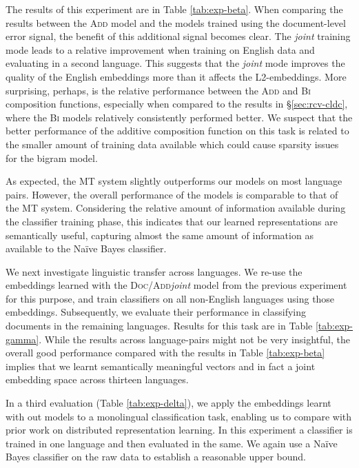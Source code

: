 \documentclass[11pt]{article}
\newcommand{\addMod}{\textsc{Add}\xspace}
\newcommand{\flatMod}{\textsc{Bi}\xspace}
\newcommand{\docModadd}{\textsc{Doc/Add}\xspace}
\newcommand{\joint}{\textit{joint}\xspace}
\begin{document}
The results of this experiment are in Table \ref{tab:exp-beta}.  When comparing
the results between the \addMod model and the models trained using the
document-level error signal, the benefit of this additional signal becomes
clear. The \joint training mode leads to a relative improvement when training
on English data and evaluating in a second language.  This suggests that the
\joint mode improves the quality of the English embeddings more than it affects
the L2-embeddings. More surprising, perhaps, is the relative performance
between the \addMod and \flatMod composition functions, especially when compared
to the results in \S\ref{sec:rcv-cldc}, where the \flatMod models relatively
consistently performed better. We suspect that the better performance of the
additive composition function on this task is related to the smaller amount of
training data available which could cause sparsity issues for the bigram model.

As expected, the MT system slightly outperforms our models on most language
pairs. However, the overall performance of the models is comparable to that of
the MT system. Considering the relative amount of information available during
the classifier training phase, this indicates that our learned representations
are semantically useful, capturing almost the same amount of information as
available to the Na\"{i}ve Bayes classifier.

We next investigate linguistic transfer across languages.  We re-use
the embeddings learned with the \docModadd \joint model from the previous
experiment for this purpose, and train classifiers on all non-English languages
using those embeddings. Subsequently, we evaluate their performance in
classifying documents in the remaining languages.  Results for this task are in
Table \ref{tab:exp-gamma}. While the results across language-pairs might not be
very insightful, the overall good performance compared with the results in Table
\ref{tab:exp-beta} implies that we learnt semantically meaningful vectors and in
fact a joint embedding space across thirteen languages.

In a third evaluation (Table \ref{tab:exp-delta}), we apply the embeddings
learnt with out models to a monolingual classification task, enabling us to
compare with prior work on distributed representation learning.  In this
experiment a classifier is trained in one language and then evaluated in the
same. We again use a Na\"{i}ve Bayes classifier on the raw data to establish a
reasonable upper bound.
\end{document}
